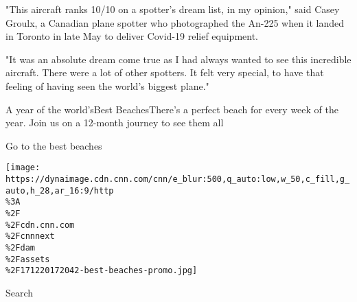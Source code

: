 "This aircraft ranks 10/10 on a spotter's dream list, in my opinion,"
said Casey Groulx, a Canadian plane spotter who photographed the An-225
when it landed in Toronto in late May to deliver Covid-19 relief
equipment.

"It was an absolute dream come true as I had always wanted to see this
incredible aircraft. There were a lot of other spotters. It felt very
special, to have that feeling of having seen the world's biggest plane."

\href{//www.cnn.com/interactive/travel/best-beaches}{}

A year of the world'sBest BeachesThere's a perfect beach for every week
of the year. Join us on a 12-month journey to see them all

Go to the best beaches

\texttt{[image: https://dynaimage.cdn.cnn.com/cnn/e\_blur:500,q\_auto:low,w\_50,c\_fill,g\_auto,h\_28,ar\_16:9/http\\\%3A\\\%2F\\\%2Fcdn.cnn.com\\\%2Fcnnnext\\\%2Fdam\\\%2Fassets\\\%2F171220172042-best-beaches-promo.jpg]}

Search


